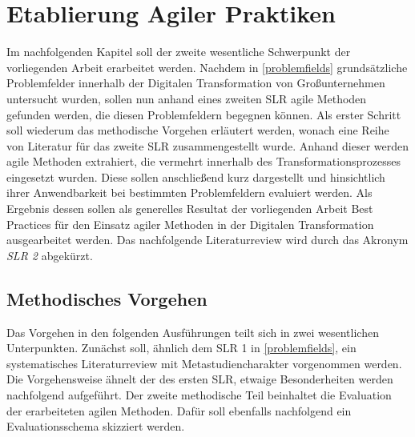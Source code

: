 \chapter{Etablierung Agiler Praktiken}
\label{agilepractices}


Im nachfolgenden Kapitel soll der zweite wesentliche Schwerpunkt der vorliegenden Arbeit erarbeitet werden. Nachdem in \ref{problemfields} grundsätzliche Problemfelder innerhalb der Digitalen Transformation von Großunternehmen untersucht wurden, sollen nun anhand eines zweiten SLR agile Methoden gefunden werden, die diesen Problemfeldern begegnen können. Als erster Schritt soll wiederum das methodische Vorgehen erläutert werden, wonach eine Reihe von Literatur für das zweite SLR zusammengestellt wurde. Anhand dieser werden agile Methoden extrahiert, die vermehrt innerhalb des Transformationsprozesses eingesetzt wurden. Diese sollen anschließend kurz dargestellt und hinsichtlich ihrer Anwendbarkeit bei bestimmten Problemfeldern evaluiert werden. Als Ergebnis dessen sollen als generelles Resultat der vorliegenden Arbeit Best Practices für den Einsatz agiler Methoden in der Digitalen Transformation ausgearbeitet werden. Das nachfolgende Literaturreview wird durch das Akronym \textit{SLR 2} abgekürzt.

\section{Methodisches Vorgehen}
\label{agilepractices:methods}


Das Vorgehen in den folgenden Ausführungen teilt sich in zwei wesentlichen Unterpunkten. Zunächst soll, ähnlich dem SLR 1 in \ref{problemfields}, ein systematisches Literaturreview mit Metastudiencharakter vorgenommen werden. Die Vorgehensweise ähnelt der des ersten SLR, etwaige Besonderheiten werden nachfolgend aufgeführt. Der zweite  methodische Teil beinhaltet die Evaluation der erarbeiteten agilen Methoden. Dafür soll ebenfalls nachfolgend ein Evaluationsschema skizziert werden.

